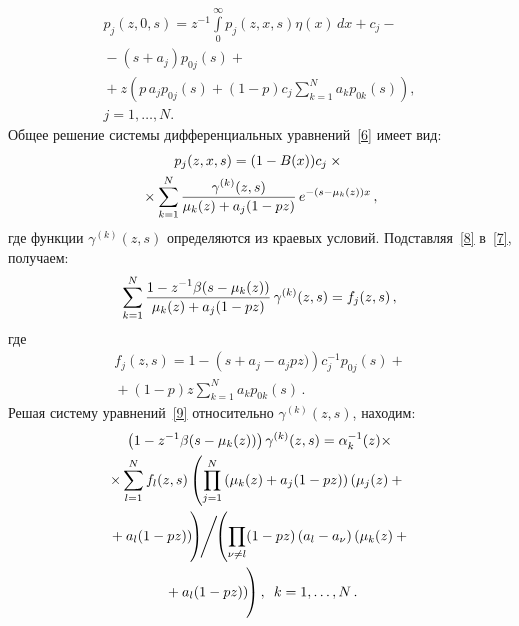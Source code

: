 \begin{multicols}{2}
\vspace*{-12pt}

\noindent
\begin{multline}
\label{7}
p_j(z,0,s)=z^{-1}\int\limits_0^{\infty}p_j(z,x,s)\eta(x)\,dx+c_j-{}\\
{}-(s+a_j)p_{0j}(s)+{}\\
{}+
z\left(p\, a_jp_{0j}(s)+(1-p) c_j\sum\limits_{k=1}^Na_kp_{0k}(s)\right),\\  
j=1,\ldots,N.
\end{multline}
Общее решение системы дифференциальных уравнений~\eqref{6} имеет вид:
\begin{multline}
\label{8}
p_j(z,x,s)=(1-B(x))c_j\times{}\\
{}\times \sum\limits_{k=1}^N\displaystyle\frac{\displaystyle \gamma^{(k)}(z,s)\mathstrut}{\displaystyle \mu_k(z)+a_j(1-pz)\mathstrut}\,
e^{-(s-\mu_k(z))x}\,,
\end{multline}
где функции  $\gamma^{(k)}(z,s)$ определяются из краевых условий.  Подставляя~\eqref{8} 
в~\eqref{7}, получаем:
\begin{equation}
\label{9}
\sum\limits_{k=1}^N\displaystyle\frac{\displaystyle 1-z^{-1}\beta(s-\mu_k(z))\mathstrut}{\displaystyle \mu_k(z)+a_j(1-p z)\mathstrut}\,
\gamma^{(k)}(z,s)=f_j(z,s)\,,
\end{equation}
где
\begin{multline*}
f_j(z,s)=1-\left(s+a_j-a_jpz)\right)c_j^{-1}p_{0j}(s)+{}\\
{}+
(1-p)z\sum\limits_{k=1}^Na_kp_{0k}(s)\,.
\end{multline*}
Решая систему уравнений~\eqref{9} относительно  $\gamma^{(k)}(z,s)$, находим:
\begin{multline*}
\left(1-z^{-1}\beta(s-\mu_k(z))\right)\gamma^{(k)}(z,s)=\alpha_k^{-1}(z)\times
\\
\times\sum\limits_{l=1}^Nf_l(z,s)
\left(\prod\limits_{j=1}^N \left(\mu_k(z)+a_j(1-pz)\right)
\left(\mu_j(z)+{}\right.\right.\\
\left.\left.{}+a_l(1-pz)\right)
\vphantom{\prod\limits_{j=1}^N}\!\!
\right)\!\!\Bigg/\!\!
\left(\prod\limits_{\nu\ne l}(1-pz)\left(
a_l-a_{\nu}\right)\left(\mu_k(z)+{}\right.\right.\\
\left.\left.{}+a_l(1-pz)\right)
\vphantom{\prod\limits_{j=1}^N}\!\!\right),\enskip
 k=1,\ldots,N\,.
\end{multline*}


\end{multicols}
